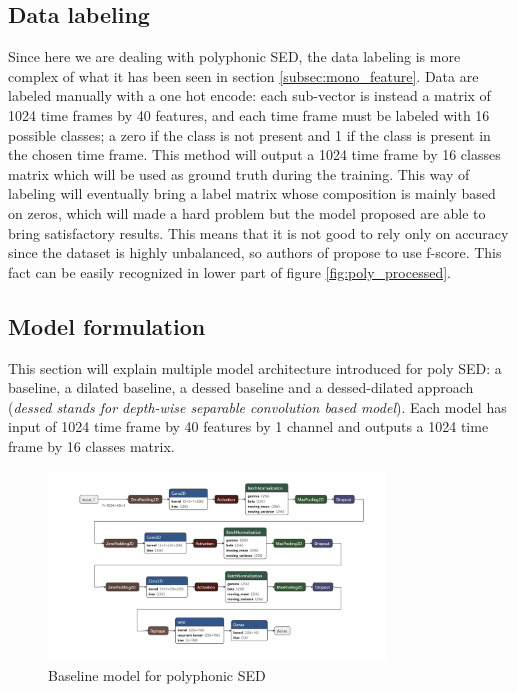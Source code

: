 \documentclass{article}
\begin{document}
\subsection{Data labeling}
\label{subsec:poly_label}

Since here we are dealing with polyphonic SED, the data labeling is more complex of what it has been seen in section \ref{subsec:mono_feature}. Data are labeled manually with a one hot encode: each sub-vector is instead a matrix of 1024 time frames by 40 features, and each time frame must be labeled with 16 possible classes; a zero if the class is not present and 1 if the class is present in the chosen time frame. This method will output a 1024 time frame by 16 classes matrix which will be used as ground truth during the training. This way of labeling will eventually bring a label matrix whose composition is mainly based on zeros, which will made a hard problem but the model proposed are able to bring satisfactory results. This means that it is not good to rely only on accuracy since the dataset is highly unbalanced, so authors of \cite{drossos2020sound} propose to use f-score. This fact can be easily recognized in lower part of figure \ref{fig:poly_processed}.

\subsection{Model formulation}
\label{subsec:poly_model}

This section will explain multiple model architecture introduced for poly SED: a baseline, a dilated baseline, a dessed baseline and a dessed-dilated approach (\textit{dessed stands for depth-wise separable convolution based model}). Each model has input of 1024 time frame by 40 features by 1 channel and outputs a 1024 time frame by 16 classes matrix.

\begin{figure}[H]
	\centering
	\includegraphics[width=0.8\textwidth]{./images/poly/baseline.png}	
	\caption{Baseline model for polyphonic SED}
	\label{fig:poly_baseline}
\end{figure}
\end{document}
